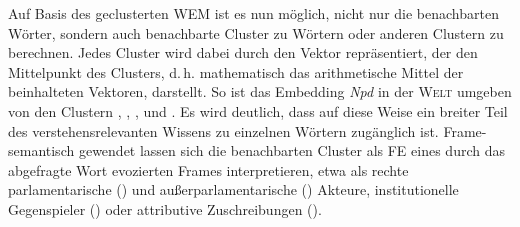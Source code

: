 Auf Basis des geclusterten WEM ist es nun möglich, nicht nur die benachbarten Wörter, sondern auch benachbarte Cluster zu Wörtern oder anderen Clustern zu berechnen. Jedes Cluster wird dabei durch den Vektor repräsentiert, der den Mittelpunkt des Clusters, d.\,h. mathematisch das arithmetische Mittel der beinhalteten Vektoren, darstellt. So ist das Embedding \emph{Npd} in der \textsc{Welt} umgeben von den Clustern , , ,  und . Es wird deutlich, dass auf diese Weise ein breiter Teil des verstehensrelevanten Wissens zu einzelnen Wörtern zugänglich ist. Frame-semantisch gewendet lassen sich die benachbarten Cluster als FE eines durch das abgefragte Wort evozierten Frames interpretieren, etwa als rechte parlamentarische () und außerparlamentarische () Akteure, institutionelle Gegenspieler () oder attributive Zuschreibungen ().

